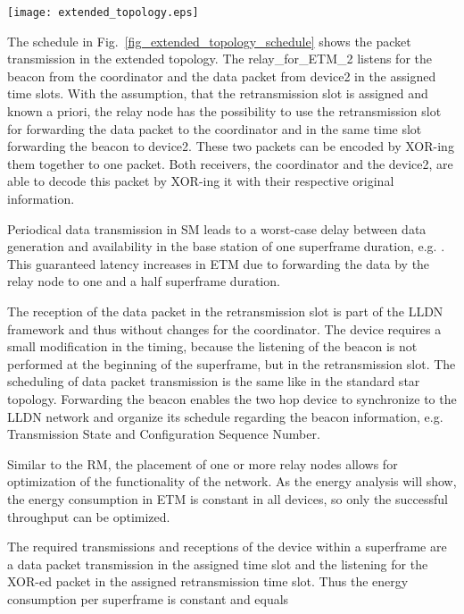 \documentclass[times,10pt,twocolumn]{article}
\begin{document}
\begin{figure*}[!t]
\centering
\texttt{[image: extended\_topology.eps]}
\caption{Example of the schedule for the proposed extended topology mode (ETM)}
    \label{fig_extended_topology_schedule}
\end{figure*}

The schedule in Fig.~\ref{fig_extended_topology_schedule} shows the packet transmission in the extended topology. The relay\_for\_ETM\_2 listens for the beacon from the coordinator and the data packet from device2 in the assigned time slots. With the assumption, that the retransmission slot is assigned and known a priori, the relay node has the possibility to use the retransmission slot for forwarding the data packet to the coordinator and in the same time slot forwarding the beacon to device2. These two packets can be encoded by XOR-ing them together to one packet. Both receivers, the coordinator and the device2, are able to decode this packet by XOR-ing it with their respective original information.

Periodical data transmission in SM leads to a worst-case delay between data generation and availability in the base station of one superframe duration, e.g. . This guaranteed latency increases in ETM due to forwarding the data by the relay node to one and a half superframe duration.

The reception of the data packet in the retransmission slot is part of the LLDN framework and thus without changes for the coordinator. The device requires a small modification in the timing, because the listening of the beacon is not performed at the beginning of the superframe, but in the retransmission slot. The scheduling of data packet transmission is the same like in the standard star topology. Forwarding the beacon enables the two hop device to synchronize to the LLDN network and organize its schedule regarding the beacon information, e.g. Transmission State and Configuration Sequence Number.

Similar to the RM, the placement of one or more relay nodes allows for optimization of the functionality of the network. As the energy analysis will show, the energy consumption in ETM is constant in all devices, so only the successful throughput can be optimized.

The required transmissions and receptions of the device within a superframe are a data packet transmission in the assigned time slot and the listening for the XOR-ed packet in the assigned retransmission time slot. Thus the energy consumption per superframe is constant and equals
\end{document}
